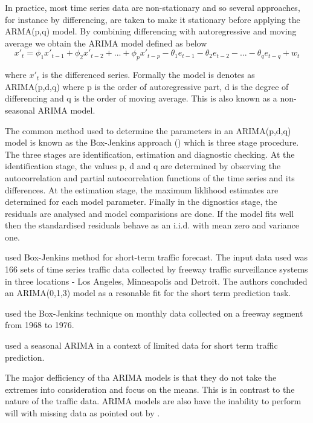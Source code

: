 In practice, most time series data are non-stationary and so several approaches, for instance
by differencing, are taken to make it stationary before applying the ARMA(p,q) model. By
combining differencing with autoregressive and moving average we obtain the ARIMA model defined
as below
        \begin{equation} \label{eq:arima}
          x'_{t} = \phi_{1}x'_{t-1} + \phi_{2}x'_{t-2} + ... + \phi_{p}x'_{t-p} -
          \theta_{1}e_{t-1} - \theta_{2}e_{t-2} - ... - \theta_{q}e_{t-q} + w_{t}
        \end{equation}

where $x'_{t}$ is the differenced series. Formally the model is denotes as ARIMA(p,d,q) where p
is the order of autoregressive part, d is the degree of differencing and q is the order of moving
average. This is also known as a non-seasonal ARIMA model.

The common method used to determine the parameters in an ARIMA(p,d,q) model is known as the
Box-Jenkins approach (\citet{box2015time}) which is three stage procedure. The three stages are
identification, estimation and diagnostic checking. At the identification stage, the values p, d
and q are determined by observing the autocorrelation and partial autocorrelation functions of
the time series and its differences. At the estimation stage, the maximum liklihood estimates are
determined for each model parameter. Finally in the dignostics stage, the residuals are analysed
and model comparisions are done. If the model fits well then the standardised residuals behave as
an i.i.d. with mean zero and variance one.

\citet{ahmed1979analysis} used Box-Jenkins method for short-term traffic forecast. The input data
used was 166 sets of time series traffic data collected by freeway traffic surveillance systems in
three locations - Los Angeles, Minneapolis and Detroit. The authors concluded an ARIMA(0,1,3) model
as a resonable fit for the short term prediction task.

\citet{nihan1980use} used the Box-Jenkins technique on monthly data collected on a freeway segment
from 1968 to 1976.

\citet{kumar2015short} used a seasonal ARIMA in a context of limited data for short term traffic 
prediction.

The major defficiency of tha ARIMA models is that they do not take the extremes into
consideration and focus on the means. This is in contrast to the nature of the traffic data.
ARIMA models are also have the inability to perform will with missing data as pointed out by
\citet{smith1997traffic}.

